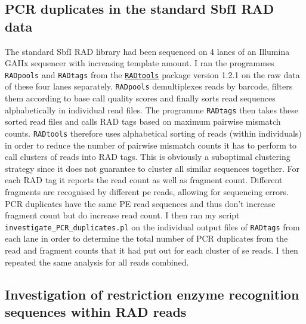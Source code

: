 \documentclass[a4paper,12pt,times,print,index,custombib,custommargin]{PhDThesisPSnPDF}\usepackage[]{graphicx}\usepackage[]{color}
\begin{document}
\begin{landscape}
\end{landscape}



\FloatBarrier
\subsection{PCR duplicates in the standard SbfI RAD data}

The standard SbfI RAD library had been sequenced on 4 lanes of an Illumina GAIIx sequencer with increasing template amount. I ran the programmes \texttt{RADpools} and \texttt{RADtags} from the \href{https://github.com/johnomics/RADtools.git}{\texttt{RADtools}} package version 1.2.1 on the raw data of these four lanes separately. \texttt{RADpools} demultiplexes reads by barcode, filters them according to base call quality scores and finally sorts read sequences alphabetically in individual read files. The programme \texttt{RADtags} then takes these sorted read files and calls \glspl{RAD tag} based on maximum pairwise mismatch counts. \texttt{RADtools} therefore uses alphabetical sorting of reads (within individuals) in order to reduce the number of pairwise mismatch counts it has to perform to call clusters of reads into \glspl{RAD tag}. This is obviously a suboptimal clustering strategy since it does not guarantee to cluster all similar sequences together. For each \gls{RAD tag} it reports the read count as well as \gls{fragment} count. Different fragments are recognised by different \gls{pe} reads, allowing for sequencing errors. PCR duplicates have the same PE read sequences and thus don't increase fragment count but do increase read count. I then ran my script \texttt{investigate\_PCR\_duplicates.pl} on the individual output files of \texttt{RADtags} from each lane in order to determine the total number of PCR duplicates from the read and fragment counts that it had put out for each cluster of \gls{se} reads. I then repeated the same analysis for all reads combined.

\FloatBarrier
\subsection{Investigation of restriction enzyme recognition sequences within RAD reads}
\end{document}
